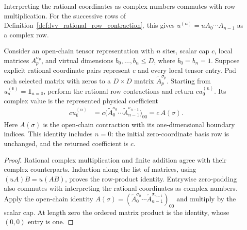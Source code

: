 \begin{lemma}
    \label{lem:lvv_rational_contraction_correct}
    \leanok
    Interpreting the rational coordinates as complex numbers commutes
    with row multiplication. For the successive rows of
    Definition~\ref{def:lvv_rational_row_contraction}, this gives
    $u^{(n)}=uA_0\cdots A_{n-1}$ as a complex row.

    Consider an open-chain tensor representation with $n$ sites,
    scalar cap $c$, local matrices $A_p^{\sigma_p}$, and virtual
    dimensions $b_0,\ldots,b_n\le D$, where $b_0=b_n=1$.
    Suppose explicit rational coordinate pairs represent $c$ and every
    local tensor entry. Pad each selected matrix with zeros to a
    $D\times D$ matrix $\widetilde A_p^{\sigma_p}$. Starting from
    $u^{(0)}_a=\mathbf1_{a=0}$, perform the rational row contractions
    and return $cu^{(n)}_0$. Its complex value is the represented
    physical coefficient
    \begin{align*}
        cu^{(n)}_0
         & =c\bigl(\widetilde A_0^{\sigma_0}\cdots
        \widetilde A_{n-1}^{\sigma_{n-1}}\bigr)_{00}
        =c\,A(\sigma).
    \end{align*}
    Here $A(\sigma)$ is the open-chain contraction with its
    one-dimensional boundary indices.
    This identity includes $n=0$: the initial zero-coordinate basis
    row is unchanged, and the returned coefficient is $c$.
\end{lemma}
\begin{proof}\leanok
    Rational complex multiplication and finite addition agree with
    their complex counterparts. Induction along the list of matrices,
    using $(uA)B=u(AB)$, proves the row-product identity.
    Entrywise zero-padding also commutes with interpreting the rational
    coordinates as complex numbers. Apply the open-chain identity
    $A(\sigma)=(\widetilde A_0^{\sigma_0}\cdots
        \widetilde A_{n-1}^{\sigma_{n-1}})_{00}$ and multiply by the scalar
    cap. At length zero the ordered matrix product is the identity,
    whose $(0,0)$ entry is one.
\end{proof}

